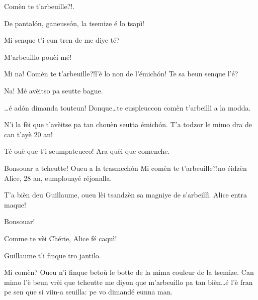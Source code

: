 \begin{drama}

\Vioupspeaks \og Comèn te t'arbeuille?!\fg.

\Vioujspeaks{} De pantal\'on, ganeuss\'on, la tsemize é lo tsapì!

\Vioupspeaks Mi senque t'i eun tren de me diye té?

\Vioujspeaks M'arbeuillo pouèi mé!

\Vioupspeaks Mi na! \og Comèn te t’arbeuille?!\fg l’è lo non de l'émich\'on! Te sa beun senque l'é?

\Vioujspeaks Na! Mé avèitso pa seutte bague.

\Vioupspeaks \ldots é ad\'on dimanda touteun! Donque\ldots te euspleuccon comèn t'arbeillì a la modda.

\Vioujspeaks N'i la fèi que t'avèitse pa tan chouèn seutta émich\'on. T'a todzor le mimo dra de can t'ayè 20 an!

\Vioupspeaks{} Té ouè que t'i seumpateucco! Ara quèi que comenche.





\Guillaumespeaks Bonsouar a tcheutte! Oueu a la trasmech\'on \og Mi comèn te t'arbeuille?!\fg no éidzèn Alice, 28 an, eumplouayé réjonalla.

\Cheriespeaks T'a bièn deu Guillaume, oueu lèi tsandzèn sa magniye de s’arbeillì. Alice entra maque!


\Alicespeaks Bonsouar!


\Guillaumespeaks Comme te vèi Chérie, Alice fé caquì!

\Cheriespeaks Guillaume t’i finque tro jantilo. 

\Alicespeaks Mi comèn? Oueu n'i finque betoù le botte de la mima couleur de la tsemize. Can mimo l'è beun vrèi que tcheutte me diyon que m'arbeuillo pa tan bièn\ldots é l'è fran pe sen que si viin-a seuilla: pe vo dimandé eunna man.


\end{drama}
